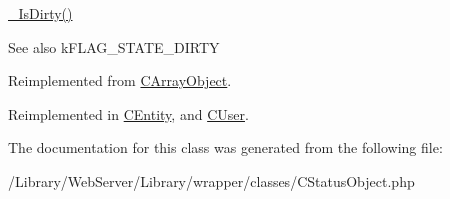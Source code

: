 \hyperlink{class_c_status_object_a19c4ac94dfe26476e780d77b99744d43}{\-\_\-\-Is\-Dirty()}

\begin{DoxySeeAlso}{See also}
k\-F\-L\-A\-G\-\_\-\-S\-T\-A\-T\-E\-\_\-\-D\-I\-R\-T\-Y 
\end{DoxySeeAlso}


Reimplemented from \hyperlink{class_c_array_object_a2852b78f58379e507b5e7d7cb8e5326b}{C\-Array\-Object}.



Reimplemented in \hyperlink{class_c_entity_a887a87fc716e36a0d4c1477dbaf5bb67}{C\-Entity}, and \hyperlink{class_c_user_aed8557e18a89d868cedf5a48328b33b2}{C\-User}.



The documentation for this class was generated from the following file\-:\begin{DoxyCompactItemize}
\item 
/\-Library/\-Web\-Server/\-Library/wrapper/classes/C\-Status\-Object.\-php\end{DoxyCompactItemize}
